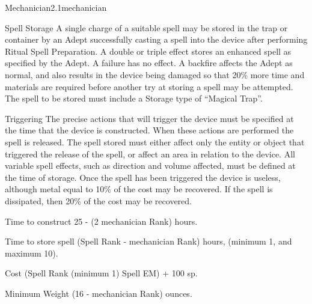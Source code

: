 \begin{skill}{Mechanician}{2.1}{mechanician}
\begin{Description}
\item[Spell Storage]
A single charge of a suitable spell may be stored in the trap or
container by an Adept successfully casting a spell into the device
after performing Ritual Spell Preparation.  A double or triple effect
stores an enhanced spell as specified by the Adept.  A failure has no
effect.  A backfire affects the Adept as normal, and also results in
the device being damaged so that 20\% more time and materials are
required before another try at storing a spell may be attempted.  The
spell to be stored must include a Storage type of ``Magical Trap''.

\item[Triggering]
The precise actions that will trigger the device must be specified at
the time that the device is constructed.  When these actions are
performed the spell is released.  The spell stored must either affect
only the entity or object that triggered the release of the spell, or
affect an area in relation to the device.  All variable spell effects,
such as direction and volume affected, must be defined at the time of
storage.  Once the spell has been triggered the device is useless,
although metal equal to 10\% of the cost may be recovered.  If the
spell is dissipated, then 20\% of the cost may be recovered.

\item[Time to construct] 25 - (2 \x mechanician Rank) hours.

\item[Time to store spell] (Spell Rank - mechanician Rank) hours, (minimum 1,
and maximum 10).

\item[Cost] (Spell Rank (minimum 1) \x Spell EM) + 100 sp.

\item[Minimum Weight] (16 - mechanician Rank) ounces.
\end{Description}
\end{skill}
